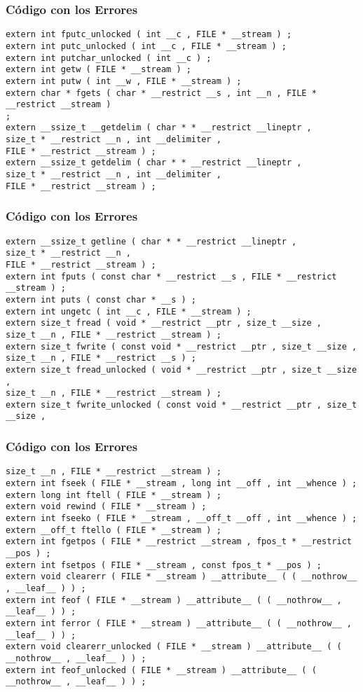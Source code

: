\documentclass{beamer}
\begin{document}
\begin{frame}[fragile]
\frametitle{C\'odigo con los Errores}
\begin{lstlisting}[style=CStyle]
extern int fputc_unlocked ( int __c , FILE * __stream ) ; 
extern int putc_unlocked ( int __c , FILE * __stream ) ; 
extern int putchar_unlocked ( int __c ) ; 
extern int getw ( FILE * __stream ) ; 
extern int putw ( int __w , FILE * __stream ) ; 
extern char * fgets ( char * __restrict __s , int __n , FILE * __restrict __stream ) 
; 
extern __ssize_t __getdelim ( char * * __restrict __lineptr , 
size_t * __restrict __n , int __delimiter , 
FILE * __restrict __stream ) ; 
extern __ssize_t getdelim ( char * * __restrict __lineptr , 
size_t * __restrict __n , int __delimiter , 
FILE * __restrict __stream ) ; 
\end{lstlisting}
\end{frame}
\begin{frame}[fragile]
\frametitle{C\'odigo con los Errores}
\begin{lstlisting}[style=CStyle]
extern __ssize_t getline ( char * * __restrict __lineptr , 
size_t * __restrict __n , 
FILE * __restrict __stream ) ; 
extern int fputs ( const char * __restrict __s , FILE * __restrict __stream ) ; 
extern int puts ( const char * __s ) ; 
extern int ungetc ( int __c , FILE * __stream ) ; 
extern size_t fread ( void * __restrict __ptr , size_t __size , 
size_t __n , FILE * __restrict __stream ) ; 
extern size_t fwrite ( const void * __restrict __ptr , size_t __size , 
size_t __n , FILE * __restrict __s ) ; 
extern size_t fread_unlocked ( void * __restrict __ptr , size_t __size , 
size_t __n , FILE * __restrict __stream ) ; 
extern size_t fwrite_unlocked ( const void * __restrict __ptr , size_t __size , 
\end{lstlisting}
\end{frame}
\begin{frame}[fragile]
\frametitle{C\'odigo con los Errores}
\begin{lstlisting}[style=CStyle]
size_t __n , FILE * __restrict __stream ) ; 
extern int fseek ( FILE * __stream , long int __off , int __whence ) ; 
extern long int ftell ( FILE * __stream ) ; 
extern void rewind ( FILE * __stream ) ; 
extern int fseeko ( FILE * __stream , __off_t __off , int __whence ) ; 
extern __off_t ftello ( FILE * __stream ) ; 
extern int fgetpos ( FILE * __restrict __stream , fpos_t * __restrict __pos ) ; 
extern int fsetpos ( FILE * __stream , const fpos_t * __pos ) ; 
extern void clearerr ( FILE * __stream ) __attribute__ ( ( __nothrow__ , __leaf__ ) ) ; 
extern int feof ( FILE * __stream ) __attribute__ ( ( __nothrow__ , __leaf__ ) ) ; 
extern int ferror ( FILE * __stream ) __attribute__ ( ( __nothrow__ , __leaf__ ) ) ; 
extern void clearerr_unlocked ( FILE * __stream ) __attribute__ ( ( __nothrow__ , __leaf__ ) ) ; 
extern int feof_unlocked ( FILE * __stream ) __attribute__ ( ( __nothrow__ , __leaf__ ) ) ; 
\end{lstlisting}
\end{frame}
\end{document}
